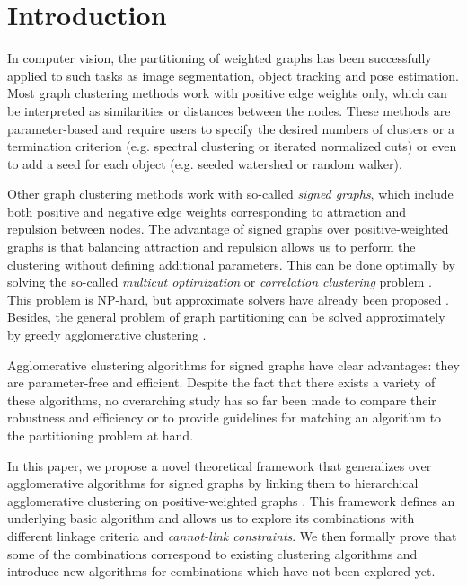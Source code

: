 
\section{Introduction}
In computer vision, the partitioning of weighted graphs has been successfully applied to such tasks as image segmentation, object tracking and pose estimation. 
Most graph clustering methods work with positive edge weights only, which can be interpreted as similarities or distances between the nodes. These methods are parameter-based and require users to specify the desired numbers of clusters or a termination criterion (e.g. spectral clustering or iterated normalized cuts) or even to add a seed for each object  (e.g. seeded watershed or random walker).  

Other graph clustering methods work with so-called \emph{signed graphs}, which include both positive and negative edge weights corresponding to attraction and repulsion between nodes. The advantage of signed graphs over positive-weighted graphs is that balancing attraction and repulsion allows us to perform the clustering without defining additional parameters. This can be done optimally by solving the so-called \emph{multicut optimization} or \emph{correlation clustering} problem \cite{kappes2011globally,chopra1991multiway}. This problem is NP-hard, but approximate solvers have already been proposed \cite{beier2016efficient}. Besides, the general problem of graph partitioning can be solved approximately by greedy agglomerative clustering \cite{keuper2015efficient,levinkov2017comparative,wolf2018mutex,kardoostsolving}. 


Agglomerative clustering algorithms for signed graphs have clear advantages: they are parameter-free and efficient. Despite the fact that there exists a variety of these algorithms, no overarching study has so far been made to compare their robustness and efficiency or to provide guidelines for matching an algorithm to the partitioning problem at hand. 


In this paper, we propose a novel theoretical framework that generalizes over agglomerative algorithms for signed graphs by linking them to hierarchical agglomerative clustering on positive-weighted graphs \cite{lance1967general}. This framework defines an underlying basic algorithm and allows us to explore its combinations with different linkage criteria and \emph{cannot-link constraints}. 
We then formally prove that some of the combinations correspond to existing clustering algorithms and introduce new algorithms for combinations which have not been explored yet.

